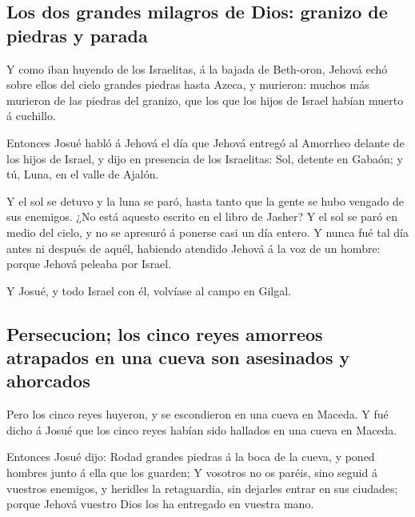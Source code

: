 \hypertarget{los-dos-grandes-milagros-de-dios-granizo-de-piedras-y-parada}{%
\subsection{Los dos grandes milagros de Dios: granizo de piedras y
parada}\label{los-dos-grandes-milagros-de-dios-granizo-de-piedras-y-parada}}

 Y como iban huyendo de los Israelitas, á la bajada de
Beth-oron, Jehová echó sobre ellos del cielo grandes piedras hasta
Azeca, y murieron: muchos más murieron de las piedras del granizo, que
los que los hijos de Israel habían muerto á cuchillo.

 Entonces Josué habló á Jehová el día que Jehová entregó
al Amorrheo delante de los hijos de Israel, y dijo en presencia de los
Israelitas: Sol, detente en Gabaón; y tú, Luna, en el valle de Ajalón.

 Y el sol se detuvo y la luna se paró, hasta tanto que la
gente se hubo vengado de sus enemigos. ¿No está aquesto escrito en el
libro de Jasher? Y el sol se paró en medio del cielo, y no se apresuró á
ponerse casi un día entero.  Y nunca fué tal día antes ni
después de aquél, habiendo atendido Jehová á la voz de un hombre: porque
Jehová peleaba por Israel.

 Y Josué, y todo Israel con él, volvíase al campo en
Gilgal.

\hypertarget{persecucion-los-cinco-reyes-amorreos-atrapados-en-una-cueva-son-asesinados-y-ahorcados}{%
\subsection{Persecucion; los cinco reyes amorreos atrapados en una cueva
son asesinados y
ahorcados}\label{persecucion-los-cinco-reyes-amorreos-atrapados-en-una-cueva-son-asesinados-y-ahorcados}}

 Pero los cinco reyes huyeron, y se escondieron en una
cueva en Maceda.  Y fué dicho á Josué que los cinco reyes
habían sido hallados en una cueva en Maceda.

 Entonces Josué dijo: Rodad grandes piedras á la boca de
la cueva, y poned hombres junto á ella que los guarden; 
Y vosotros no os paréis, sino seguid á vuestros enemigos, y heridles la
retaguardia, sin dejarles entrar en sus ciudades; porque Jehová vuestro
Dios los ha entregado en vuestra mano.


